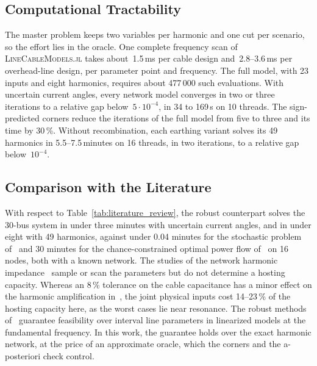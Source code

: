 \subsection{Computational Tractability}
\label{sec:tractability}

The master problem keeps two variables per harmonic and one cut per scenario, so the effort lies in the oracle. One complete frequency scan of \textsc{LineCableModels.jl} takes about~1.5\,ms per cable design and~2.8--3.6\,ms per overhead-line design, per parameter point and frequency. The full model, with 23 inputs and eight harmonics, requires about 477\,000 such evaluations. With uncertain current angles, every network model converges in two or three iterations to a relative gap below~$5\cdot10^{-4}$, in 34 to 169\,s on 10 threads. The sign-predicted corners reduce the iterations of the full model from five to three and its time by 30\,\%. Without recombination, each earthing variant solves its 49 harmonics in 5.5--7.5\,minutes on 16 threads, in two iterations, to a relative gap below~$10^{-4}$.

\subsection{Comparison with the Literature}
\label{sec:literature_comparison}

With respect to Table~\ref{tab:literature_review}, the robust counterpart solves the 30-bus system in under three minutes with uncertain current angles, and in under eight with 49 harmonics, against under 0.04 minutes for the stochastic problem of~\cite{vanacker_shhc} and 30 minutes for the chance-constrained optimal power flow of~\cite{sun_distribution_2022} on 16 nodes, both with a known network. The studies of the network harmonic impedance~\cite{testa_probabilistic_2002,li_probabilistic_2018,li2020,barakou_parameter_2023} sample or scan the parameters but do not determine a hosting capacity. Whereas an 8\,\% tolerance on the cable capacitance has a minor effect on the harmonic amplification in~\cite{barakou_parameter_2023}, the joint physical inputs cost 14--23\,\% of the hosting capacity here, as the worst cases lie near resonance. The robust methods of~\cite{christakou_voltage_2018,liu_feasible_2023} guarantee feasibility over interval line parameters in linearized models at the fundamental frequency. In this work, the guarantee holds over the exact harmonic network, at the price of an approximate oracle, which the corners and the a-posteriori check control.
